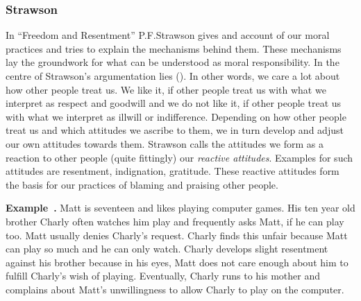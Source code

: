 \documentclass{article}
\newcounter{example}
\newenvironment{example}[1][]{\refstepcounter{example}\par\medskip
   \noindent \textbf{Example~\theexample. #1} \rmfamily}{\medskip}
\begin{document}

\subsubsection{Strawson}


%
In ``Freedom and Resentment'' P.F.Strawson gives and account of our moral
practices and tries to explain the mechanisms behind them. These mechanisms lay
the groundwork for what can be understood as moral responsibility.
In the centre of Strawson's argumentation lies (\cite[p.5]{Strawson1962}). In other words, we care a lot about how other
people treat us. We like it, if other people treat us with what we interpret as
respect and goodwill and we do not like it, if other people treat us with what
we interpret as illwill or indifference. Depending on how other people treat us
and which attitudes we ascribe to them, we in turn develop and adjust our own
attitudes towards them. Strawson calls the attitudes we form as a reaction to
other people (quite fittingly) our \textit{reactive
attitudes}. Examples for such attitudes are resentment, indignation, gratitude.
These reactive attitudes form the basis for our practices of blaming and
praising other people.



\begin{example}
	Matt is seventeen and likes playing computer games. His ten year old brother
	Charly often watches him play and frequently asks Matt, if he can play
	too. Matt usually denies Charly's request. Charly finds this unfair
	because Matt can play so much and he can only watch. Charly develops
	slight resentment against his brother because in his eyes, Matt
	does not care enough about him to fulfill Charly's wish of playing.
	Eventually, Charly runs to his mother and complains about Matt's
	unwillingness to allow Charly to play on the computer.
\end{example}
\end{document}
